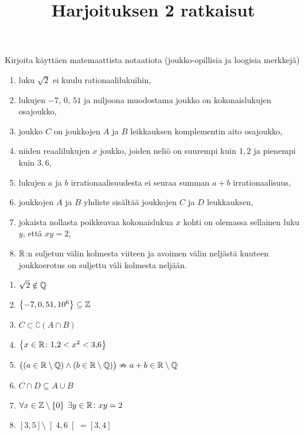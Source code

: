 \documentclass[12pt,a4paper]{article}
\title{Harjoituksen 2 ratkaisut}
\date{}
\author{}
\begin{document}
\maketitle

\noindent

\begin{exercise}
  Kirjoita käyttäen matemaattista notaatiota (joukko-opillisia ja loogisia
  merkkejä)
\begin{enumerate}[label=\alph*), nosep]
  \item luku \(\sqrt{2}\) ei kuulu rationaalilukuihin,
  \item lukujen \(-7\), \(0\), \(51\) ja miljoona muodostama joukko on
    kokonaislukujen osajoukko,
  \item joukko \(C\) on joukkojen \(A\) ja \(B\) leikkauksen komplementin
    aito osajoukko,
  \item niiden reaalilukujen \(x\) joukko, joiden neliö on suurempi kuin
    \(1{,}2\) ja pienempi kuin \(3{,}6\),
  \item lukujen \(a\) ja \(b\) irrationaalisuudesta ei seuraa summan
    \(a + b\) irrationaalisuus,
  \item joukkojen \(A\) ja \(B\) yhdiste sisältää joukkojen \(C\) ja \(D\)
    leukkauksen,
  \item jokaista nollasta poikkeavaa kokonaislukua \(x\) kohti on olemassa
    sellainen luku \(y\), että \(xy = 2\),
  \item \(\mathbb{R}\):n suljetun välin kolmesta viiteen ja avoimen välin neljästä
    kuuteen joukkoerotus on suljettu väli kolmesta neljään.
\end{enumerate}
\end{exercise}

\begin{solution}
\leavevmode\par
\begin{enumerate}[label=\alph*), nosep]
\item \(\sqrt{2} \notin \mathbb{Q}\)
\item \(\left\lbrace-7, 0, 51, 10^6\right\rbrace \subseteq \mathbb{Z}\)
\item \(C \subset \complement{(A \cap B)}\)
\item \(\left\lbrace x \in \mathbb{R} \colon 1{,}2 < x^2 < 3{,}6\right\rbrace\)
\item \(\bigl((a \in \mathbb{R} \setminus \mathbb{Q}) \land (b \in \mathbb{R} \setminus \mathbb{Q})\bigr)
  \nRightarrow a + b \in \mathbb{R} \setminus \mathbb{Q}\)
\item \(C \cap D \subseteq A \cup B\)
\item \(\forall x \in \mathbb{Z} \setminus \left\lbrace0\right\rbrace \; \exists y \in \mathbb{R}
  \colon xy = 2\)
\item \([3, 5] \setminus \left]4, 6\right[ = [3, 4]\)
\end{enumerate}
\end{solution}
\end{document}
